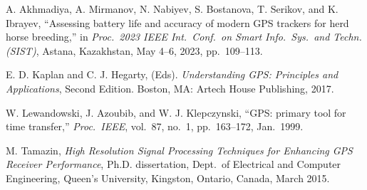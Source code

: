 \documentclass[12pt]{article}
\begin{document}
\begin{thebibliography}{9}  %

A. Akhmadiya, A. Mirmanov, N. Nabiyev, S. Bostanova, T. Serikov,
and K. Ibrayev, ``Assessing battery life and accuracy of
modern GPS trackers for herd horse breeding,'' in \emph{Proc.~2023
IEEE Int.\ Conf.\ on Smart Info.\ Sys.\ and Techn. (SIST)},
Astana, Kazakhstan, May 4--6, 2023, pp.~109--113.

E. D. Kaplan and C. J. Hegarty, (Eds). \emph{Understanding GPS:  Principles
and Applications}, Second Edition.  Boston, MA: Artech House Publishing, 2017.

W. Lewandowski, J. Azoubib, and W. J. Klepczynski, ``GPS: primary
tool for time transfer,'' \emph{Proc.\ IEEE}, vol.~87, no.~1,
pp.~163--172, Jan.~1999.

M. Tamazin, \emph{High Resolution Signal Processing Techniques for
Enhancing GPS Receiver Performance}, Ph.D. dissertation,
Dept.~of Electrical and Computer Engineering, Queen's University,
Kingston, Ontario, Canada, March 2015.


\end{thebibliography}
\end{document}
